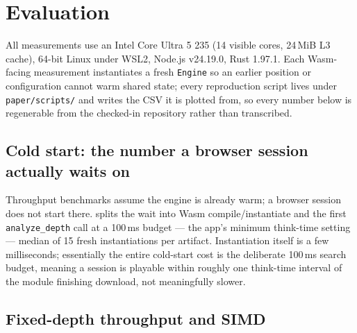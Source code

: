 \documentclass[10pt,twocolumn]{article}
\newcommand{\code}[1]{\texttt{#1}}
\begin{document}
\section{Evaluation}
\label{sec:evaluation}

All measurements use an Intel Core Ultra 5 235 (14 visible cores, 24\,MiB L3
cache), 64-bit Linux under WSL2, Node.js v24.19.0, Rust 1.97.1. Each
Wasm-facing measurement instantiates a fresh \code{Engine} so an earlier
position or configuration cannot warm shared state; every reproduction
script lives under \code{paper/scripts/} and writes the CSV it is plotted
from, so every number below is regenerable from the checked-in repository
rather than transcribed.

\subsection{Cold start: the number a browser session actually waits on}

Throughput benchmarks assume the engine is already warm; a browser session
does not start there.  splits the wait into Wasm
compile/instantiate and the first \code{analyze\_depth} call at a 100\,ms
budget --- the app's minimum think-time setting --- median of 15 fresh
instantiations per artifact.  Instantiation itself is a few milliseconds;
essentially the entire cold-start cost is the deliberate 100\,ms search
budget, meaning a session is playable within roughly one think-time interval
of the module finishing download, not meaningfully slower.

\begin{table}[t]
\centering
\small
\caption{Cold start at a 100\,ms move budget, median of 15 samples.}
\label{tab:coldstart}
\end{table}

\subsection{Fixed-depth throughput and SIMD}
\label{sec:multipv}
\end{document}

